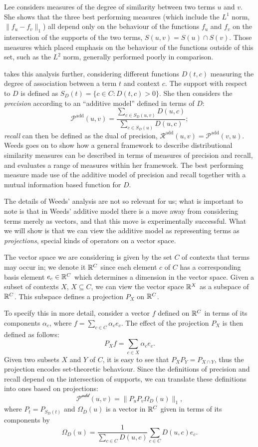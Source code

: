 \documentclass{report}
\begin{document}
Lee considers measures of the degree of similarity between two terms $u$ and $v$. She shows that the three best performing measures (which include the $L^1$ norm, $\|f_u - f_v\|_1$) all depend only on the behaviour of the functions $f_u$ and $f_v$ on the intersection of the supports of the two terms, $S(u,v) = S(u) \cap S(v)$. Those measures which placed emphasis on the behaviour of the functions outside of this set, such as the $L^2$ norm, generally performed poorly in comparison.

\cite{Weeds:03} takes this analysis further, considering different functions $D(t,c)$ measuring the degree of association between a term $t$ and context $c$. The support with respect to $D$ is defined as $S_D(t) = \{c \in C : D(t,c) > 0\}$. She then considers the \emph{precision} according to an ``additive model'' defined in terms of $D$:
$$\mathcal{P}^\textrm{add}(u,v) = \frac{\sum_{c \in S_D(u,v)} D(u,c)}{\sum_{c\in S_D(u)} D(u,c)};$$
\emph{recall} can then be defined as the dual of precision, $\mathcal{R}^\textrm{add}(u,v) = \mathcal{P}^\textrm{add}(v,u)$. Weeds goes on to show how a general framework to describe distributional similarity measures can be described in terms of measures of precision and recall, and evaluates a range of measures within her framework. The best performing measure made use of the additive model of precision and recall together with a mutual information based function for $D$.

The details of Weeds' analysis are not so relevant for us; what is important to note is that in Weeds' additive model there is a move away from considering terms merely as vectors, and that this move is experimentally successful. What we will show is that we can view the additive model as representing terms as \emph{projections}, special kinds of operators on a vector space.

The vector space we are considering is given by the set $C$ of contexts that terms may occur in; we denote it $\mathbb{R}^C$ since each element $c$ of $C$ has a corresponding basis element $e_c \in \mathbb{R}^C$ which determines a dimension in the vector space. Given a subset of contexts $X$, $X\subseteq C$, we can view the vector space $\mathbb{R}^X$ as a subspace of $\mathbb{R}^C$. This subspace defines a projection $P_X$ on $\mathbb{R}^C$.

To specify this in more detail, consider a vector $f$ defined on $\mathbb{R}^C$ in terms of its components $\alpha_c$, where $f = \sum_{c\in C} \alpha_c e_c.$
The effect of the projection $P_X$ is then defined as follows:
$$P_Xf = \sum_{c \in X} \alpha_c e_c.$$
Given two subsets $X$ and $Y$ of $C$, it is easy to see that $P_XP_Y = P_{X \cap Y}$, thus the projection encodes set-theoretic behaviour. Since the definitions of precision and recall depend on the intersection of supports, we can translate these definitions into ones based on projections:
$$\mathcal{P^\textrm{add}}(u,v) = \|P_uP_v\Omega_D(u)\|_1,$$
where $P_t = P_{S_D(t)}$ and $\Omega_D(u)$ is a vector in $\mathbb{R}^C$ given in terms of its components by
$$\Omega_D(u) = \frac{1}{\sum_{c\in C} D(u,c)}\sum_{c \in C}D(u,c)e_c.$$
\end{document}
